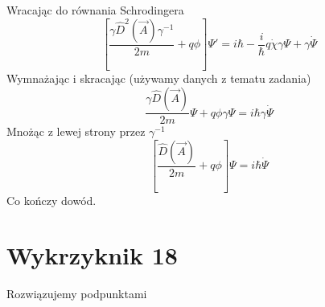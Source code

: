 \documentclass[a4paper,12pt]{article}
\begin{document}
Wracając do równania Schrodingera
\begin{equation*}
  \left[ \frac{\gamma \hat{D}^2(\vec{A}) \gamma^{-1}
}{2m} + q\phi \right] \Psi' = i \hbar -\frac{i}{\hbar}q \dot{\chi} \gamma\Psi +
\gamma\dot{\Psi}
\end{equation*}
Wymnażając i skracając (używamy danych z tematu zadania)
\begin{equation*}
  \frac{\gamma\hat{D}(\vec{A})}{2m}\Psi + q\phi \gamma \Psi = i\hbar \gamma
  \dot{\Psi}
\end{equation*}
Mnożąc z lewej strony przez $\gamma^{-1}$
\begin{equation*}
  \left[ \frac{\hat{D}(\vec{A})}{2m} + q\phi \right]  \Psi = i\hbar 
  \dot{\Psi}
\end{equation*}
Co kończy dowód.

\section{Wykrzyknik 18}
	Rozwiązujemy podpunktami
\end{document}
